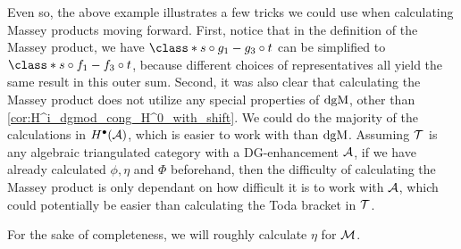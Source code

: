Even so, the above example illustrates a few tricks we could use when calculating Massey products moving forward. First, notice that in the definition of the Massey product, we have \( \class*{ s \circ g_1 - g_3 \circ t} \) can be simplified to \( \class*{s \circ f_1 - f_3 \circ t} \), because different choices of representatives all yield the same result in this outer sum. Second, it was also clear that calculating the Massey product does not utilize any special properties of \( \operatorname{dgM} \), other than \autoref{cor:H^i_dgmod_cong_H^0_with_shift}. We could do the majority of the calculations in \( H^{\bullet}({\mathcal{A}}) \), which is easier to work with than \( \operatorname{dgM} \). Assuming \( {\mathcal{T}} \) is any algebraic triangulated category with a DG-enhancement \( {\mathcal{A}} \), if we have already calculated \( \phi, \eta \) and \( \Phi \) beforehand, then the difficulty of calculating the Massey product is only dependant on how difficult it is to work with \( {\mathcal{A}} \), which could potentially be easier than calculating the Toda bracket in \( {\mathcal{T}} \).

For the sake of completeness, we will roughly calculate \( \eta \) for \( {\mathcal{M}} \).

